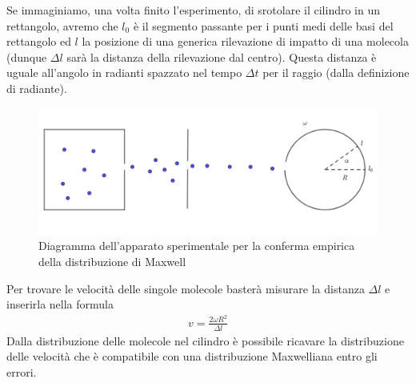 \documentclass[10pt,a4paper]{article}
\begin{document}
Se immaginiamo, una volta finito l'esperimento, di srotolare il cilindro in un rettangolo, avremo che $l_0$ è il segmento passante per i punti medi delle basi del rettangolo ed $l$ la posizione di una generica rilevazione di impatto di una molecola (dunque $\Delta l$ sarà la distanza della rilevazione dal centro).  Questa distanza è uguale all'angolo in radianti spazzato nel tempo $\Delta t$ per il raggio (dalla definizione di radiante).
\begin{figure}[h!]
	\centering
	\includegraphics[width=0.9\linewidth]{Esperimento_Maxwell}
	\caption{Diagramma dell'apparato sperimentale per la conferma empirica della distribuzione di Maxwell}
	\label{fig:esperimentomaxwell}
\end{figure}
\FloatBarrier
Per trovare le velocità delle singole molecole basterà misurare la distanza $\Delta l$ e inserirla nella formula
\begin{align*}
	v = \frac{2\omega R^2}{\Delta l}
\end{align*}
Dalla distribuzione delle molecole nel cilindro è possibile ricavare la distribuzione delle velocità che è compatibile con una distribuzione Maxwelliana entro gli errori. 
\end{document}
